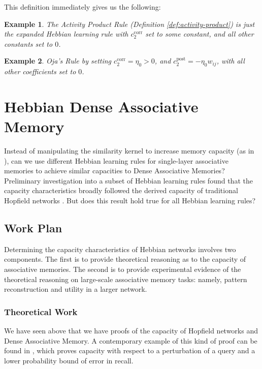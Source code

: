 \documentclass{article}
\newtheorem{example}{Example}[subsection]
\theoremstyle{definition}
\begin{document}
This definition immediately gives us the following:
\begin{example}
  The Activity Product Rule (Definition \ref{def:activity-product}) is
  just the expanded Hebbian learning rule with $c_2^\text{corr}$
  set to some constant, and all other constants set to $0$.
\end{example}

\begin{example}
  \textit{Oja's Rule} \parencite{oja_simplified_1982}
  by setting $c_2^\text{corr} = \eta_0 > 0$,
  and $c_2^\text{post} = - \eta_0 w_{ij}$, with all other
  coefficients set to $0$.
\end{example}

\section{Hebbian Dense Associative Memory}\label{sec:hebbian-dam}

Instead of manipulating the similarity kernel to increase
memory capacity (as in \textcite{hoover_dense_2024,hu_provably_2024}),
can we use different Hebbian learning rules for
single-layer associative memories to
achieve similar capacities to Dense Associative Memories? Preliminary
investigation into a subset of Hebbian learning rules
found that the capacity characteristics broadly followed the
derived capacity of traditional Hopfield networks
\parencite{lansner_benchmarking_2025}. But does this result
hold true for all Hebbian learning rules?

\subsection{Work Plan}\label{sec:work-plan}

Determining the capacity characteristics of Hebbian networks
involves two components. The first is to provide theoretical reasoning
as to the capacity of associative memories. The second is to
provide experimental evidence of the theoretical reasoning on
large-scale associative memory tasks: namely, pattern reconstruction
and utility in a larger network.

\subsubsection{Theoretical Work}

We have seen above that we have proofs of the capacity of
Hopfield networks and Dense Associative Memory. A contemporary
example of this kind of proof can be found in \parencite{bao_capacity_2022},
which proves capacity with respect to a perturbation of a query
and a lower probability bound of error in recall.
\end{document}
